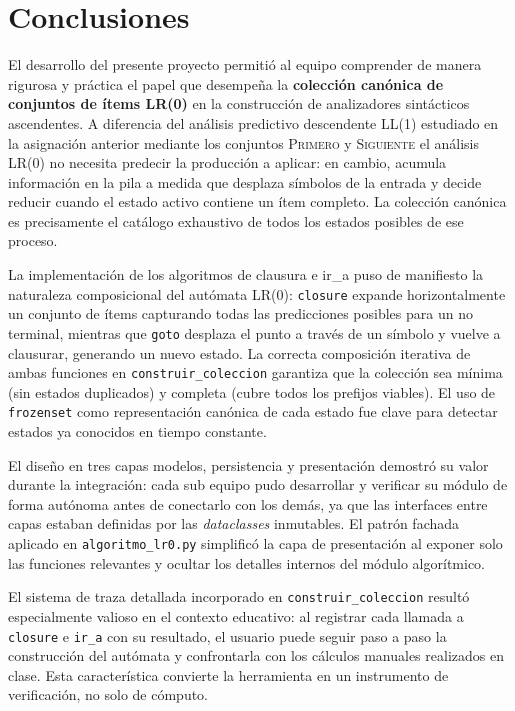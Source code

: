 \section{Conclusiones}

\setlength{\parindent}{1.5cm}

\indent El desarrollo del presente proyecto permitió al equipo comprender de manera rigurosa y
práctica el papel que desempeña la \textbf{colección canónica de conjuntos de ítems LR(0)}
en la construcción de analizadores sintácticos ascendentes. A diferencia del análisis
predictivo descendente LL(1) \textemdash{}estudiado en la asignación anterior mediante los
conjuntos \textsc{Primero} y \textsc{Siguiente}\textemdash{} el análisis LR(0) no necesita
predecir la producción a aplicar: en cambio, acumula información en la pila a medida que
desplaza símbolos de la entrada y decide reducir cuando el estado activo contiene un ítem
completo. La colección canónica es precisamente el catálogo exhaustivo de todos los estados
posibles de ese proceso.

\indent La implementación de los algoritmos de clausura e ir\_a puso de manifiesto la
naturaleza composicional del autómata LR(0): \texttt{closure} expande horizontalmente un
conjunto de ítems capturando todas las predicciones posibles para un no terminal, mientras
que \texttt{goto} desplaza el punto a través de un símbolo y vuelve a clausurar, generando
un nuevo estado. La correcta composición iterativa de ambas funciones en
\texttt{construir\_coleccion} garantiza que la colección sea mínima (sin estados duplicados)
y completa (cubre todos los prefijos viables). El uso de \texttt{frozenset} como
representación canónica de cada estado fue clave para detectar estados ya conocidos en
tiempo constante.

\indent El diseño en tres capas \textemdash{}modelos, persistencia y
presentación\textemdash{} demostró su valor durante la integración: cada sub equipo pudo
desarrollar y verificar su módulo de forma autónoma antes de conectarlo con los demás, ya
que las interfaces entre capas estaban definidas por las \textit{dataclasses} inmutables.
El patrón fachada aplicado en \texttt{algoritmo\_lr0.py} simplificó la capa de presentación
al exponer solo las funciones relevantes y ocultar los detalles internos del módulo
algorítmico.

\indent El sistema de traza detallada incorporado en \texttt{construir\_coleccion} resultó
especialmente valioso en el contexto educativo: al registrar cada llamada a \texttt{closure}
e \texttt{ir\_a} con su resultado, el usuario puede seguir paso a paso la construcción del
autómata y confrontarla con los cálculos manuales realizados en clase. Esta característica
convierte la herramienta en un instrumento de verificación, no solo de cómputo.

